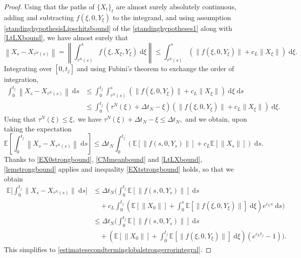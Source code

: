 \documentclass[reqno,12pt]{amsart}
\theoremstyle{plain} %
\theoremstyle{definition} %
\begin{document}
\begin{proof}
    Using that the paths of $\{X_t\}_t$ are almost surely absolutely continuous, adding and subtracting $f(\xi, 0, Y_\xi)$ to the integrand, and using assumption \cref{standinghypothesisLipschitzbound} of the \cref{standinghypotheses1} along with \cref{LtLXbound}, we have almost surely that
    \[
      \left\|X_s - X_{\tau^N(s)}\right\| = \left\|\int_{\tau^N(s)}^s f(\xi, X_\xi, Y_\xi)\;\mathrm{d}\xi\right\| \leq \int_{\tau^N(s)}^s \left(\|f(\xi, 0, Y_\xi)\| + c_L\|X_\xi\|\right)\;\mathrm{d}\xi.
    \]
    Integrating over $[0, t_j]$ and using Fubini's theorem to exchange the order of integration,
    \begin{align*}
        \int_0^{t_j} \left\|X_s - X_{\tau^N(s)}\right\| \;\mathrm{d}s & \leq \int_0^{t_j}\int_{\tau^N(s)}^s (\|f(\xi, 0, Y_\xi)\| + c_L\|X_\xi\|) \;\mathrm{d}\xi \;\mathrm{d}s \\
        & \leq \int_0^{t_j} (\tau^N(\xi) + \Delta t_N - \xi) (\|f(\xi, 0, Y_\xi)\| + c_L\|X_\xi\|) \;\mathrm{d}\xi.
    \end{align*}
    Using that $\tau^N(\xi) \leq \xi,$ we have $\tau^N(\xi) + \Delta t_N - \xi \leq \Delta t_N,$ and we obtain, upon taking the expectation
    \[
        \mathbb{E}\left[\int_0^{t_j}\left\|X_s - X_{\tau^N(s)}\right\| \;\mathrm{d}s\right] \leq \Delta t_N \int_0^{t_j} \left(\mathbb{E}\left[\|f(s, 0, Y_s)\|\right] + c_L\mathbb{E}\left[\|X_s\|\right]\right) \;\mathrm{d}s.
    \]
    Thanks to \cref{EX0strongbound}, \cref{CMmeanbound} and \cref{LtLXbound}, \cref{lemstrongbound} applies and inequality \cref{EXtstrongbound} holds, so that we obtain
    \begin{align*}
        \mathbb{E}\bigg[\int_0^{t_j}  \|X_s - X_{\tau^N(s)}\| \;\mathrm{d}s\bigg] & \leq \Delta t_N  \bigg(\int_0^{t_j} \mathbb{E}[\|f(s, 0, Y_s)\|] \;\mathrm{d}s \\
        & \quad + c_L\int_0^{t_j}\left(\mathbb{E}[\|X_0\|] + \int_0^s \mathbb{E}[\|f(\xi, 0, Y_\xi)\|]\;\mathrm{d}\xi\right)e^{c_L s} \;\mathrm{d}s\bigg) \\
        & \leq \Delta t_N  \bigg(\int_0^{t_j} \mathbb{E}[\|f(s, 0, Y_s)\|] \;\mathrm{d}s \\
        & \quad + \left(\mathbb{E}[\|X_0\|] + \int_0^{t_j} \mathbb{E}[\|f(\xi, 0, Y_\xi)\|]\;\mathrm{d}\xi\right)\left(e^{c_L t_j} - 1\right) \bigg).
    \end{align*}
    This simplifies to \cref{estimatesecondterminglobalstrongerrorintegral}.
\end{proof}
\end{document}
